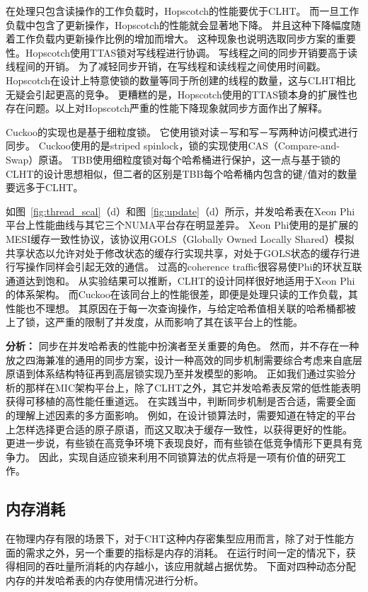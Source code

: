在处理只包含读操作的工作负载时，Hopscotch的性能要优于CLHT。
而一旦工作负载中包含了更新操作，Hopscotch的性能就会显著地下降。
并且这种下降幅度随着工作负载内更新操作比例的增加而增大。
这种现象也说明选取同步方案的重要性。Hopscotch使用TTAS锁对写线程进行协调。
写线程之间的同步开销要高于读线程间的开销。
为了减轻同步开销，在写线程和读线程之间使用时间戳。
Hopscotch在设计上特意使锁的数量等同于所创建的线程的数量，这与CLHT相比无疑会引起更高的竞争。
更糟糕的是，Hopscotch使用的TTAS锁本身的扩展性也存在问题。以上对Hopscotch严重的性能下降现象就同步方面作出了解释。

Cuckoo的实现也是基于细粒度锁。
它使用锁对读－写和写－写两种访问模式进行同步。
Cuckoo使用的是striped spinlock，锁的实现使用CAS（Compare-and-Swap）原语。
TBB使用细粒度锁对每个哈希桶进行保护，这一点与基于锁的CLHT的设计思想相似，但二者的区别是TBB每个哈希桶内包含的键/值对的数量要远多于CLHT。

如图~\ref{fig:thread_scal}（d）和图~\ref{fig:update}（d）所示，并发哈希表在Xeon Phi平台上性能曲线与其它三个NUMA平台存在明显差异。
Xeon Phi使用的是扩展的MESI缓存一致性协议，该协议用GOLS（Globally Owned Locally Shared）模拟共享状态以允许对处于修改状态的缓存行实现共享，对处于GOLS状态的缓存行进行写操作同样会引起无效的通信。
过高的coherence traffic很容易使Phi的环状互联通道达到饱和。
从实验结果可以推断，CLHT的设计同样很好地适用于Xeon Phi的体系架构。
而Cuckoo在该同台上的性能很差，即便是处理只读的工作负载，其性能也不理想。
其原因在于每一次查询操作，与给定哈希值相关联的哈希桶都被上了锁，这严重的限制了并发度，从而影响了其在该平台上的性能。

\textbf{分析：} 同步在并发哈希表的性能中扮演者至关重要的角色。
然而，并不存在一种放之四海兼准的通用的同步方案，设计一种高效的同步机制需要综合考虑来自底层原语到体系结构特征再到高层锁实现乃至并发模型的影响。
正如我们通过实验分析的那样在MIC架构平台上，除了CLHT之外，其它并发哈希表反常的低性能表明获得可移植的高性能任重道远。
在实践当中，判断同步机制是否合适，需要全面的理解上述因素的多方面影响。
例如，在设计锁算法时，需要知道在特定的平台上怎样选择更合适的原子原语，而这又取决于缓存一致性，以获得更好的性能。
更进一步说，有些锁在高竞争环境下表现良好，而有些锁在低竞争情形下更具有竞争力。
因此，实现自适应锁来利用不同锁算法的优点将是一项有价值的研究工作。

\subsection{内存消耗}
\label{sec:memory_comsume}
在物理内存有限的场景下，对于CHT这种内存密集型应用而言，除了对于性能方面的需求之外，另一个重要的指标是内存的消耗。
在运行时间一定的情况下，获得相同的吞吐量所消耗的内存越小，该应用就越占据优势。
下面对四种动态分配内存的并发哈希表的内存使用情况进行分析。

